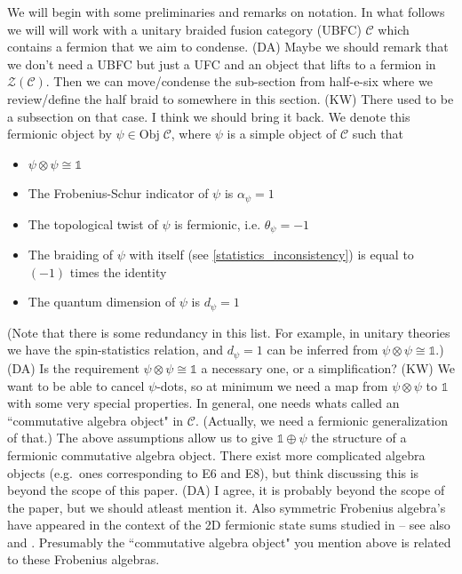 \documentclass[12pt,a4paper]{article}
\newcommand{\tp}{\otimes}
\newcommand{\unit}{\mathds{1}}
\newcommand{\mcz}{\mathcal{Z}}
\newcommand{\mcc}{\mathcal{C}}
\newcommand{\ot}{\otimes}
\newcommand{\dave}[1]{{\color{ao(english)}\footnotesize{(DA) #1}}}
\newcommand{\kw}[1]{{\color{kwcolor}\footnotesize{(KW) #1}}}
\begin{document}
We will begin with some preliminaries and remarks on notation. 
In what follows we will will work with a unitary braided fusion category (UBFC) $\mathcal{C}$ which contains a fermion that we aim to condense. 
\dave{Maybe we should remark that we don't need a UBFC but just a UFC and an object that lifts to a fermion in $\mcz(\mcc)$.
Then we can move/condense the sub-section from half-e-six where we review/define the half braid to somewhere in this section. }
\kw{There used to be a subsection on that case.  I think we should bring it back.}
We denote this fermionic object by $\psi \in \text{Obj}\; \mathcal{C}$, 
where $\psi$ is a simple object of $\mcc$ such that
\begin{itemize} 
	\item $\psi\ot\psi\cong\unit$
	\item The Frobenius-Schur indicator of $\psi$ is $\alpha_\psi =1$
	\item The topological twist of $\psi$ is fermionic, i.e. $\theta_\psi =-1$
	\item The braiding of $\psi$ with itself (see \eqref{statistics_inconsistency}) is equal to $(-1)$ times the identity
	\item The quantum dimension of $\psi$ is $d_\psi=1$
\end{itemize}
(Note that there is some redundancy in this list.
For example, 
in unitary theories we have the spin-statistics relation, and $d_\psi=1$ can be inferred from $\psi\tp\psi \cong \unit$.)
\dave{Is the requirement $\psi \tp \psi \cong \unit$ a necessary one, or a simplification?}
\kw{We want to be able to cancel $\psi$-dots, so at minimum we need a map from $\psi\tp\psi$ to $\unit$ with some very special properties.
In general, one needs whats called an ``commutative algebra object" in $\mcc$.
(Actually, we need a fermionic generalization of that.)
The above assumptions allow us to give $\unit\oplus\psi$ the structure of a fermionic commutative algebra object.
There exist more complicated algebra objects (e.g.\ ones corresponding to E6 and E8),
but think discussing this is beyond the scope of this paper.}
\dave{
I agree, it is probably beyond the scope of the paper, but we should atleast mention it.
Also symmetric Frobenius algebra's have appeared in the context of the 2D fermionic state sums studied in \cite{turzillo2016} -- see also \cite{novak2015b} and \cite{Novak2015,Barrett2015}.
Presumably the ``commutative algebra object" you mention above is related to these Frobenius algebras.
}
\end{document}
